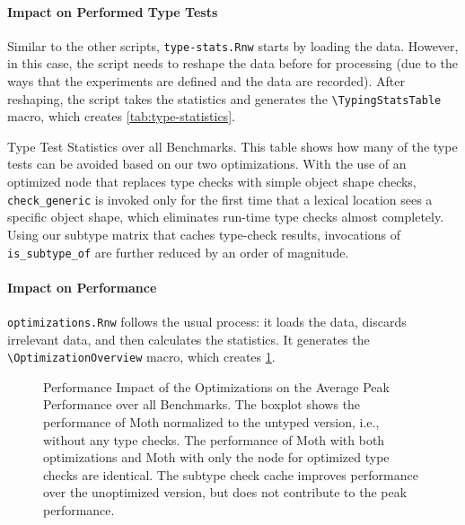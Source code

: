 \documentclass[a4paper,USenglish]{darts-v2019}
\newcommand{\ie}{i.e.\xspace}
\newcommand{\code}[1]{\texttt{#1}}
\begin{document}
\paragraph*{Impact on Performed Type Tests}

Similar to the other scripts,
\code{type-stats.Rnw} starts by loading the data.
However, in this case,
the script needs to reshape the data
before for processing
(due to the ways that the experiments are defined and the data are recorded).
After reshaping, the script takes the statistics
and generates the \code{\textbackslash{}TypingStatsTable} macro,
which creates \cref{tab:type-statistics}.

\begin{table}[htb]
  \caption{Type Test Statistics over all Benchmarks.
  This table shows how many of the type tests can be avoided based on our two optimizations.
  With the use of an optimized node that replaces type checks with simple object shape checks,
  \code{check\_generic} is invoked only for the first time that a lexical location
  sees a specific object shape, which eliminates run-time type checks almost completely.
  Using our subtype matrix that caches type-check results,
  invocations of \code{is\_subtype\_of} are further reduced by an order of magnitude.}
  \label{tab:type-statistics}

  \begin{center}
    \TypingStatsTable{}
  \end{center}
\end{table}

\paragraph*{Impact on Performance}

\code{optimizations.Rnw} follows the usual process:
it loads the data,
discards irrelevant data,
and then calculates the
statistics.
It generates the \code{\textbackslash{}OptimizationOverview} macro,
which creates \cref{fig:perf-impact-optimization}.

\begin{figure}[htb]
  \centering
	\OptimizationOverview{}
  \caption{Performance Impact of the Optimizations on the Average Peak Performance over all Benchmarks.
  The boxplot shows the performance of Moth normalized to the untyped version, \ie,
  without any type checks.
  The performance of Moth with both optimizations and Moth
  with only the node for optimized type checks are identical.
  The subtype check cache improves performance over the unoptimized version,
  but does not contribute to the peak performance.
  }
	\label{fig:perf-impact-optimization}
\end{figure}
\end{document}
